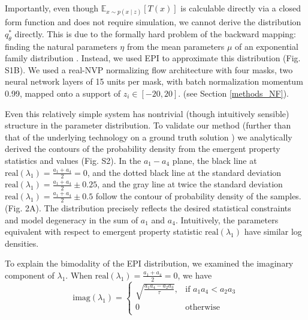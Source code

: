 \documentclass[11pt]{article}
\begin{document}
Importantly, even though $\mathbb{E}_{x\sim p(x \mid z)}\left[T(x)\right]$ is calculable directly via a closed form function and does not require simulation, we cannot derive the distribution $q^*_\theta$ directly.  This is due to the formally hard problem of the backward mapping: finding the natural parameters $\eta$ from the mean parameters $\mu$ of an exponential family distribution \cite{wainwright2008graphical}.  Instead, we used EPI to approximate this distribution (Fig. S1B). We used a real-NVP normalizing flow architecture with four masks, two neural network layers of 15 units per mask, with batch normalization momentum 0.99, mapped onto a support of $z_i \in \left[-20, 20 \right]$. (see Section \ref{methods_NF}).

Even this relatively simple system has nontrivial (though intuitively sensible) structure in the parameter distribution.  To validate our method (further than that of the underlying technology on a ground truth solution \cite{loaiza2017maximum}) we analytically derived the contours of the probability density from the emergent property statistics and values (Fig. S2).  In the $a_1-a_4$ plane, the black line at $\text{real}(\lambda_1) = \frac{a_1 + a_4}{2} = 0$, and the dotted black line at
the standard deviation $\text{real}(\lambda_1) = \frac{a_1 + a_4}{2} \pm 0.25$, and the gray line at twice the standard deviation
$\text{real}(\lambda_1) = \frac{a_1 + a_4}{2} \pm 0.5$ follow the contour of probability density of the samples. (Fig. 2A). The distribution precisely reflects the desired statistical constraints and model degeneracy in the sum of $a_1$ and $a_4$.
 Intuitively, the parameters equivalent with respect to emergent property statistic $\text{real}(\lambda_1)$ have similar log densities.

To explain the bimodality of the EPI distribution, we examined the imaginary component of $\lambda_1$.  When $\text{real}(\lambda_1) = \frac{a_1 + a_4}{2} = 0$, we have
\begin{equation}
\text{imag}(\lambda_1) = \begin{cases}
                             \sqrt{\frac{a_1 a_4 - a_2 a_3}{\tau}},  & \text{if } a_1 a_4 < a_2 a_3 \\
                             0 & \text{otherwise } \\
                         \end{cases} 
\end{equation}
\end{document}

